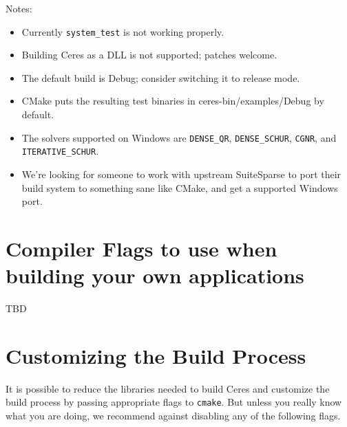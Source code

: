 Notes:
\begin{itemize}
\item Currently \texttt{system\_test} is not working properly.
\item Building Ceres as a DLL is not supported; patches welcome.
\item The default build is Debug; consider switching it to release mode.
\item CMake puts the resulting test binaries in ceres-bin/examples/Debug by
      default.
\item The solvers supported on Windows are \texttt{DENSE\_QR},
      \texttt{DENSE\_SCHUR}, \texttt{CGNR}, and \texttt{ITERATIVE\_SCHUR}.
\item We're looking for someone to work with upstream SuiteSparse to port their
      build system to something sane like CMake, and get a supported Windows
      port.
\end{itemize}

\section{Compiler Flags to use when building your own applications}
\label{sec:compiler-flags}
TBD


\section{Customizing the Build Process}
\label{sec:custom}
It is possible to reduce the libraries needed to build Ceres and
customize the build process by passing appropriate flags to \texttt{cmake}. But unless you really know what you are
doing, we recommend against disabling any of the following flags.

